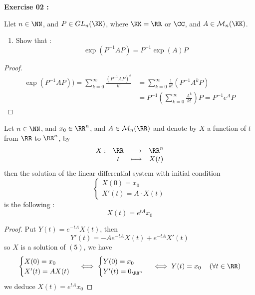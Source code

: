  \begin{center}
 \textbf{Exercise 02 : }
 \end{center}
Llet $n \in \NN $, and $P \in  
 GL_n (\KK) $, where $\KK = \RR  $ or $\CC  $, 
 and $A \in \mathcal{M} _{n}(\KK)  $. 
 \begin{enumerate}[(1)]
 \item Show that : 
	 \[
	 \exp{\left( 
	 P ^{-1} A  P \right)} =
	 P ^{-1} \exp{(A) } P
	 \]
 \end{enumerate}
 \begin{proof}
 \begin{align*}
 \exp{( P ^{-1} A P))} =
 \sum_{k=0}^{\infty}  
 \frac{(P ^{-1} A P) ^k }{k !} &=
\sum_{k=0}^{\infty}  \frac{1}{k!}
\left( P ^{-1} A^k P \right) \\
			       &= 
	P ^{-1} \left( 
	\sum_{k=0}^{\infty}  \frac{A^{k}}{k!}\right) 
	P = P ^{-1} e^{A} P
 \end{align*}
 \end{proof}
\begin{theorem}[]
Let $n \in \NN $, and $x_0 \in \RR ^n  $, and 
$A \in   \mathcal{M} _{n}(\RR ) $ and denote
by $X $ a function of $t $ from $\RR  $  to 
$\RR ^n  $, by 
\[
\begin{array}{cccc}
      X : &  \RR   & \longrightarrow & \RR ^n  \\
           &  t  & \longmapsto     & X(t)  \\ 
\end{array}
\]
then the solution of the linear differential
system with initial condition 
\begin{equation}
\begin{cases}
X(0)  = x_0 \\
X'(t)  = A \cdot X(t) 
\end{cases}
\end{equation}
is the following : 
\[
X (t) = e^{tA} x_0
\]
\end{theorem}
\begin{proof}
Put  $Y(t) = e^{-tA}X(t) $, then 
\[
Y'(t) = -A e^{-tA} X(t)  + 
e^{-tA} X'(t) 
\]
so $X$ is a solution of  $(5)$, we have 
\[
\begin{cases}
X(0)  = x_0 \\
X'(t)  = A X(t)  \\
\end{cases}
\iff 
\begin{cases}
Y(0)  = x_0 \\
Y'(t)  = 0_{\RR ^n }
\end{cases}
\iff 
Y(t) = x_0 \quad  \left( \forall  t \in \RR   \right)
\]
we deduce 
$X(t)  = e^{tA} x_0 $ 
\end{proof}
%  
